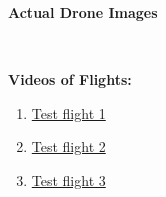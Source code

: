 \documentclass[a4paper,12pt,oneside]{book}
\begin{document}
    \textbf{Actual Drone Images}
    \begin{figure}[H]
        \centering
    \end{figure}
    \\
    \begin{figure}[H]
        \centering
    \end{figure}
    \textbf{Videos of Flights:}
\begin{enumerate}
    \item \href{https://www.youtube.com/watch?v=oRvV-g8zlzI}{Test flight 1}
    \item \href{https://www.youtube.com/watch?v=dcHOmJOeLvU}{Test flight 2}
    
    \item \href{https://www.youtube.com/watch?v=GHcQYoiWwgk}{Test flight 3}
\end{enumerate}
\end{document}
